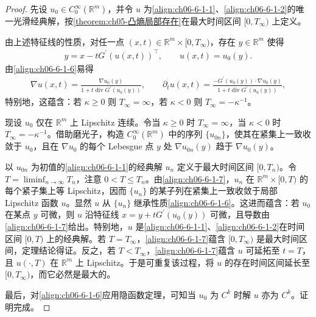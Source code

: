 \documentclass[../../main.tex]{subfiles}
\begin{document}
\begin{proof}
先设 $u_{0}\in C_{0}^{\infty}(\mathbb{R}^{m})$，并令 $u$ 为\eqref{align:ch06-6-1-1}、\eqref{align:ch06-6-1-2}的唯一光滑经典解，按\cref{theorem:ch05-凸熵局部存在}在最大时间区间 $[0,T_{\infty})$ 上定义。

由上述特征线的性质，对任一点 $(x,t)\in\mathbb{R}^{m}\times[0,T_{\infty})$，存在 $y\in\mathbb{R}^{m}$ 使得
\begin{align}
y=x-tG^{\prime}(u(x,t))^{\top},\qquad u(x,t)=u_{0}(y).
\label{align:ch06-6-1-6}
\end{align}
由\eqref{align:ch06-6-1-6}易得
\begin{align}
\nabla u(x,t)=\frac{\nabla u_{0}(y)}{1+t\operatorname{div}G^{\prime}(u_{0}(y))},\qquad
\partial_{t}u(x,t)=\frac{-G^{\prime}(u_{0}(y))\cdot\nabla u_{0}(y)}{1+t\operatorname{div}G^{\prime}(u_{0}(y))},
\label{align:ch06-6-1-7}
\end{align}
特别地，这蕴含：若 $\kappa\geqslant 0$ 则 $T_{\infty}=\infty$，若 $\kappa<0$ 则 $T_{\infty}=-\kappa^{-1}$。

现设 $u_{0}$ 仅在 $\mathbb{R}^{m}$ 上 Lipschitz 连续。令当 $\kappa\geqslant 0$ 时 $T_{\infty}=\infty$，当 $\kappa<0$ 时 $T_{\infty}=-\kappa^{-1}$。借助磨光子，构造 $C_{0}^{\infty}(\mathbb{R}^{m})$ 中的序列 $\{u_{0n}\}$，使其在紧集上一致收敛于 $u_{0}$，且在 $\nabla u_{0}$ 的每个 Lebesgue 点 $y$ 处 $\nabla u_{0n}(y)$ 趋于 $\nabla u_{0}(y)$。

以 $u_{0n}$ 为初值的\eqref{align:ch06-6-1-1}的经典解 $u_{n}$ 定义于最大时间区间 $[0,T_{n})$。令 $T=\liminf_{n\to\infty}T_{n}$，注意 $0<T\leqslant T_{n}$。由\eqref{align:ch06-6-1-7}，$u_{n}$ 在 $\mathbb{R}^{m}\times[0,T)$ 的每个紧子集上等 Lipschitz，因而 $\{u_{n}\}$ 的某子列在紧集上一致收敛于局部 Lipschitz 函数 $u$。显然 $u$ 从 $\{u_{n}\}$ 继承性质\eqref{align:ch06-6-1-6}。这进而蕴含：若 $u_{0}$ 在某点 $y$ 可微，则 $u$ 沿特征线 $x=y+tG^{\prime}(u_{0}(y))$ 可微，且导数由\eqref{align:ch06-6-1-7}给出。特别地，$u$ 是\eqref{align:ch06-6-1-1}、\eqref{align:ch06-6-1-2}在时间区间 $[0,T)$ 上的经典解。若 $T=T_{\infty}$，\eqref{align:ch06-6-1-7}蕴含 $[0,T_{\infty})$ 是最大时间区间，定理结论得证。反之，若 $T<T_{\infty}$，\eqref{align:ch06-6-1-7}蕴含 $u$ 可延拓至 $t=T$，且 $u(\cdot,T)$ 在 $\mathbb{R}^{m}$ 上 Lipschitz。于是可重复该过程，将 $u$ 的存在时间区间延长至 $[0,T_{\infty})$，而它必然是最大的。

最后，对\eqref{align:ch06-6-1-6}应用隐函数定理，可知当 $u_{0}$ 为 $C^{k}$ 时解 $u$ 亦为 $C^{k}$。证明完成。
\end{proof}
\end{document}

